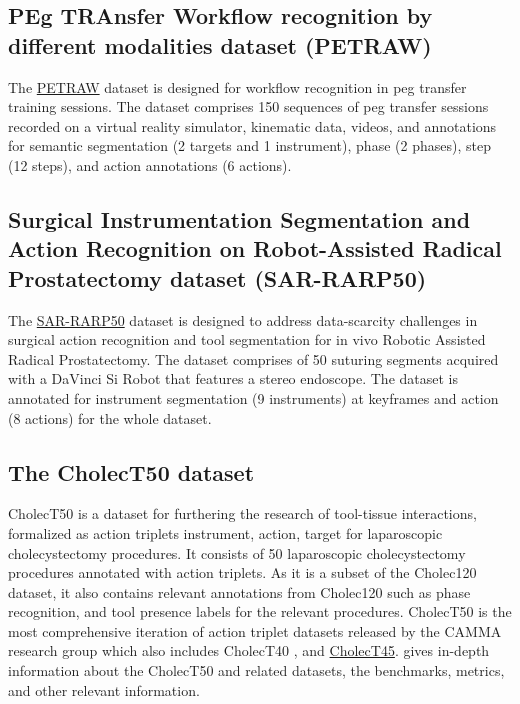 \documentclass[times,twocolumn,final]{elsarticle}
\begin{document}
\subsection{PEg TRAnsfer Workflow recognition by different modalities dataset (PETRAW)}
The \href{https://www.synapse.org/#!Synapse:syn25147789/wiki/}{PETRAW} dataset \citep{huaulme2022peg} is designed for workflow recognition in peg transfer training sessions. The dataset comprises 150 sequences of peg transfer sessions recorded on a virtual reality simulator, kinematic data, videos, and annotations for semantic segmentation (2 targets and 1 instrument), phase (2 phases), step (12 steps), and action annotations (6 actions). 


\subsection{Surgical Instrumentation Segmentation and Action Recognition on Robot-Assisted Radical Prostatectomy dataset (SAR-RARP50)}
The \href{https://www.synapse.org/#!Synapse:syn27618412/wiki/616881}{SAR-RARP50} dataset \citep{psychogyios2023sar} is designed to address data-scarcity challenges in surgical action recognition and tool segmentation for in vivo Robotic Assisted Radical Prostatectomy. The dataset comprises of 50 suturing segments acquired with a DaVinci Si Robot that features a stereo endoscope. The dataset is annotated for instrument segmentation (9 instruments) at keyframes and action (8 actions) for the whole dataset.




\subsection{The CholecT50 dataset}
CholecT50 \citep{NWOYE2022102433_rendevous} is a dataset for furthering the research of tool-tissue interactions, formalized as action triplets \textlangle{}instrument, action, target\textrangle{} for laparoscopic cholecystectomy procedures. 
It consists of 50 laparoscopic cholecystectomy procedures annotated with action triplets. As it is a subset of the Cholec120 dataset, it also contains relevant annotations from Cholec120 such as phase recognition, and tool presence labels for the relevant procedures. CholecT50 is the most comprehensive iteration of action triplet datasets released by the CAMMA research group which also includes  CholecT40 \citep{1nywoye_rec_action_triplets}, and \href{https://github.com/CAMMA-public/cholect45}{CholecT45}. \citet{nwoye2022data} gives in-depth information about the CholecT50 and related datasets, the benchmarks, metrics, and other relevant information.
\end{document}
